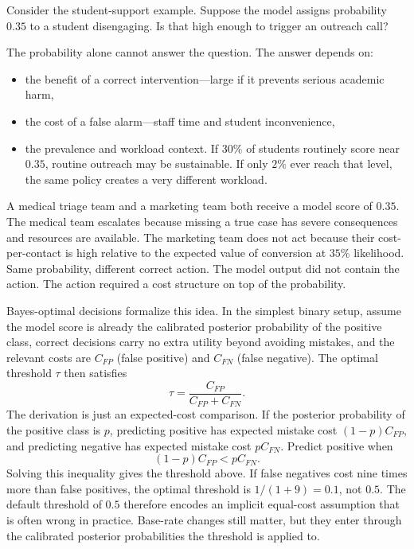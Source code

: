 Consider the student-support example. Suppose the model assigns probability $0.35$ to a student disengaging. Is that high enough to trigger an outreach call?

The probability alone cannot answer the question. The answer depends on:
\begin{itemize}[leftmargin=*]
\item the benefit of a correct intervention---large if it prevents serious academic harm,
\item the cost of a false alarm---staff time and student inconvenience,
\item the prevalence and workload context. If $30\%$ of students routinely score near $0.35$, routine outreach may be sustainable. If only $2\%$ ever reach that level, the same policy creates a very different workload.
\end{itemize}

\begin{example}
A medical triage team and a marketing team both receive a model score of $0.35$. The medical team escalates because missing a true case has severe consequences and resources are available. The marketing team does not act because their cost-per-contact is high relative to the expected value of conversion at $35\%$ likelihood. Same probability, different correct action. The model output did not contain the action. The action required a cost structure on top of the probability.
\end{example}

Bayes-optimal decisions formalize this idea. In the simplest binary setup, assume the model score is already the calibrated posterior probability of the positive class, correct decisions carry no extra utility beyond avoiding mistakes, and the relevant costs are $C_{FP}$ (false positive) and $C_{FN}$ (false negative). The optimal threshold $\tau$ then satisfies
\[
\tau = \frac{C_{FP}}{C_{FP} + C_{FN}}.
\]
The derivation is just an expected-cost comparison. If the posterior probability of the positive class is \(p\), predicting positive has expected mistake cost \((1-p)C_{FP}\), and predicting negative has expected mistake cost \(pC_{FN}\). Predict positive when
\[
(1-p)C_{FP} < pC_{FN}.
\]
Solving this inequality gives the threshold above. If false negatives cost nine times more than false positives, the optimal threshold is \(1/(1+9)=0.1\), not \(0.5\). The default threshold of \(0.5\) therefore encodes an implicit equal-cost assumption that is often wrong in practice. Base-rate changes still matter, but they enter through the calibrated posterior probabilities the threshold is applied to.

